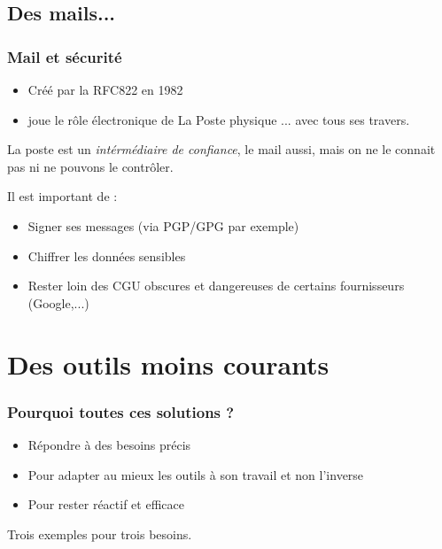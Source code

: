 \documentclass{beamer}
\begin{document}
\subsection{Des mails...} %

\begin{frame}
    \frametitle{Mail et sécurité}

    \begin{itemize}
        \item Créé par la RFC822 en 1982
        \item joue le rôle électronique de La Poste physique ... avec tous ses travers.
    \end{itemize}

    \pause{}
    
    La poste est un \textit{intérmédiaire de confiance}, le mail aussi, mais on ne le connait pas ni ne pouvons le
    contrôler.

    \pause{}

    Il est important de :

    \begin{itemize}
        \item Signer ses messages (via PGP/GPG par exemple)
        \item Chiffrer les données sensibles
        \item Rester loin des CGU obscures et dangereuses de certains fournisseurs (Google,...)
    \end{itemize}
\end{frame}

\section{Des outils moins courants} %

\begin{frame}
    \frametitle{Pourquoi toutes ces solutions ?}

    \begin{itemize}
        \item Répondre à des besoins précis
        \item Pour adapter au mieux les outils à son travail et non l'inverse
        \item Pour rester réactif et efficace
    \end{itemize}

    \pause{}

    Trois exemples pour trois besoins.
\end{frame}
\end{document}
